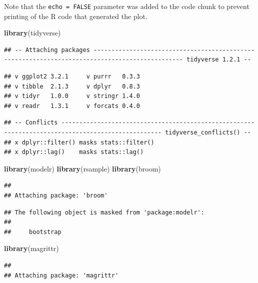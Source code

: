 \documentclass[]{article}
\newenvironment{Shaded}{\begin{snugshade}}{\end{snugshade}}
\newcommand{\KeywordTok}[1]{\textcolor[rgb]{0.13,0.29,0.53}{\textbf{#1}}}
\newcommand{\NormalTok}[1]{#1}
\begin{document}
Note that the \texttt{echo\ =\ FALSE} parameter was added to the code
chunk to prevent printing of the R code that generated the plot.

\begin{Shaded}
\begin{Highlighting}[]
\KeywordTok{library}\NormalTok{(tidyverse)}
\end{Highlighting}
\end{Shaded}

\begin{verbatim}
## -- Attaching packages ----------------------------------------------------------------------------------------------- tidyverse 1.2.1 --
\end{verbatim}

\begin{verbatim}
## v ggplot2 3.2.1     v purrr   0.3.3
## v tibble  2.1.3     v dplyr   0.8.3
## v tidyr   1.0.0     v stringr 1.4.0
## v readr   1.3.1     v forcats 0.4.0
\end{verbatim}

\begin{verbatim}
## -- Conflicts -------------------------------------------------------------------------------------------------- tidyverse_conflicts() --
## x dplyr::filter() masks stats::filter()
## x dplyr::lag()    masks stats::lag()
\end{verbatim}

\begin{Shaded}
\begin{Highlighting}[]
\KeywordTok{library}\NormalTok{(modelr)}
\KeywordTok{library}\NormalTok{(rsample)}
\KeywordTok{library}\NormalTok{(broom)}
\end{Highlighting}
\end{Shaded}

\begin{verbatim}
## 
## Attaching package: 'broom'
\end{verbatim}

\begin{verbatim}
## The following object is masked from 'package:modelr':
## 
##     bootstrap
\end{verbatim}

\begin{Shaded}
\begin{Highlighting}[]
\KeywordTok{library}\NormalTok{(magrittr)}
\end{Highlighting}
\end{Shaded}

\begin{verbatim}
## 
## Attaching package: 'magrittr'
\end{verbatim}
\end{document}

